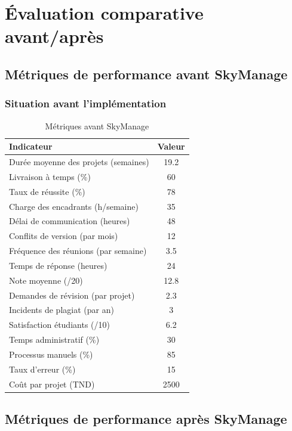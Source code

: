 \section{Évaluation comparative avant/après}

\subsection{Métriques de performance avant SkyManage}

\subsubsection{Situation avant l'implémentation}
\begin{table}[h!]
\centering
\caption{Métriques avant SkyManage}
\label{tab:before-metrics}
\begin{tabular}{|l|c|}
\hline
\textbf{Indicateur} & \textbf{Valeur} \\
\hline
Durée moyenne des projets (semaines) & 19.2 \\
\hline
Livraison à temps (\%) & 60 \\
\hline
Taux de réussite (\%) & 78 \\
\hline
Charge des encadrants (h/semaine) & 35 \\
\hline
Délai de communication (heures) & 48 \\
\hline
Conflits de version (par mois) & 12 \\
\hline
Fréquence des réunions (par semaine) & 3.5 \\
\hline
Temps de réponse (heures) & 24 \\
\hline
Note moyenne (/20) & 12.8 \\
\hline
Demandes de révision (par projet) & 2.3 \\
\hline
Incidents de plagiat (par an) & 3 \\
\hline
Satisfaction étudiants (/10) & 6.2 \\
\hline
Temps administratif (\%) & 30 \\
\hline
Processus manuels (\%) & 85 \\
\hline
Taux d'erreur (\%) & 15 \\
\hline
Coût par projet (TND) & 2500 \\
\hline
\end{tabular}
\end{table}

\subsection{Métriques de performance après SkyManage}

